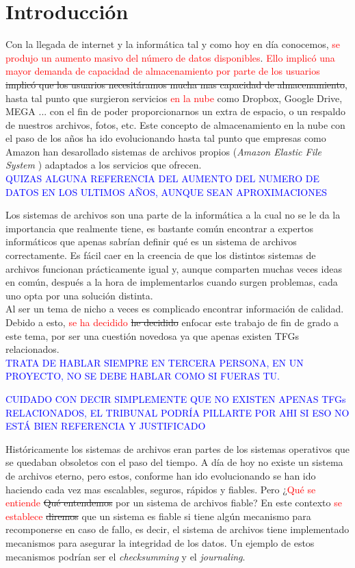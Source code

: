 \cleardoublepage
\clearpage{}
\chapter{Introducción}
Con la llegada de internet y la informática tal y como hoy en día conocemos, \textcolor{red}{se produjo un aumento masivo del número de datos disponibles}. \textcolor{red}{Ello implicó una mayor demanda de capacidad de almacenamiento por parte de los usuarios} \sout{implicó que los usuarios necesitáramos mucha mas capacidad de almacenamiento}, hasta tal punto que surgieron servicios \textcolor{red}{en la nube} como Dropbox, Google Drive, MEGA ... con el fin de poder proporcionarnos un extra de espacio, o un respaldo de nuestros archivos, fotos, etc. Este concepto de almacenamiento en la nube con el paso de los años ha ido evolucionando hasta tal punto que empresas como Amazon han desarollado sistemas de archivos propios (\textit{Amazon Elastic File System} \cite{amazon})  adaptados a los servicios que ofrecen.\\

\textcolor{blue}{QUIZAS ALGUNA REFERENCIA DEL AUMENTO DEL NUMERO DE DATOS EN LOS ULTIMOS AÑOS, AUNQUE SEAN APROXIMACIONES}

Los sistemas de archivos son una parte de la informática a la cual no se le da la importancia que realmente tiene, es bastante común encontrar a expertos informáticos que apenas sabrían definir qué es un sistema de archivos correctamente. Es fácil caer en la creencia de que los distintos sistemas de archivos funcionan prácticamente igual y, aunque comparten muchas veces ideas en común, después a la hora de implementarlos cuando surgen problemas, cada uno opta por una solución distinta.\\

Al ser un tema de nicho a veces es complicado encontrar información de calidad. Debido a esto, \textcolor{red}{se ha decidido} \sout{he decidido} enfocar este trabajo de fin de grado a este tema, por ser una cuestión novedosa ya que apenas existen TFGs relacionados.\\

\textcolor{blue}{TRATA DE HABLAR SIEMPRE EN TERCERA PERSONA, EN UN PROYECTO, NO SE DEBE HABLAR COMO SI FUERAS TU.} 

\textcolor{blue}{CUIDADO CON DECIR SIMPLEMENTE QUE NO EXISTEN APENAS TFGs RELACIONADOS, EL TRIBUNAL PODRÍA PILLARTE POR AHI SI ESO NO ESTÁ BIEN REFERENCIA Y JUSTIFICADO}


Históricamente los sistemas de archivos eran partes de los sistemas operativos que se quedaban obsoletos con el paso del tiempo. A día de hoy no existe un sistema de archivos eterno, pero estos, conforme han ido evolucionando se han ido haciendo cada vez mas escalables, seguros, rápidos y fiables. Pero ¿\textcolor{red}{Qué se entiende} \sout{Qué entendemos} por un sistema de archivos fiable? En este contexto \textcolor{red}{se establece} \sout{diremos} que un sistema es fiable si tiene algún mecanismo para recomponerse en caso de fallo, es decir, el sistema de archivos tiene implementado mecanismos para asegurar la integridad de los datos. Un ejemplo de estos mecanismos podrían ser el \textit{checksumming} y el \textit{journaling}.\\

